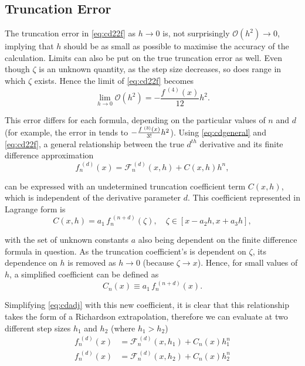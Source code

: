\subsection{Truncation Error}\label{sec:truncerr}

The truncation error in \cref{eq:cd22f} as $h\!\to\!0$ is, not surprisingly $\mathcal{O}(h^2)\!\to\!0$, implying that $h$ should be as small as possible to maximise the accuracy of the calculation.
Limits can also be put on the true truncation error as well.
Even though $\zeta$ is an unknown quantity, as the step size decreases, so does range in which $\zeta$ exists.
Hence the limit of \cref{eq:cd22f} becomes
\begin{equation}
\lim_{h \to 0}\mathcal{O}(h^2) =  - \frac{f^{\;(4)}(x)}{12}h^2.
\end{equation}

This error differs for each formula, depending on the particular values of $n$ and $d$ (for example, the error in  tends to $\cramped{-\frac{f^{\;(3)}(x)}{3!}h^2}$).
Using \cref{eq:cdgeneral} and \cref{eq:cd22f}, a general relationship between the true $d^{th}$ derivative and its finite difference approximation
\begin{equation}
 f_n^{\;(d)}(x) = \mathcal{F}_n^{\,(d)}(x,h) + C(x,h)h^n,\label{eq:cdadj}
\end{equation}

can be expressed with an undetermined truncation coefficient term $C(x,h)$, which is independent of the derivative parameter $d$.
This coefficient represented in Lagrange form is
\begin{equation}
C(x,h) = a_1\,f_n^{\;(n+d)}(\zeta), \quad \zeta \in [x-a_2h,x+a_3h],\label{eq:cdcxh}
\end{equation}

with the set of unknown constants $a$ also being dependent on the finite difference formula in question.
As the truncation coefficient's is dependent on $\zeta$, its dependence on $h$ is removed as $h\!\to\!0$ (because $\zeta\!\to\!x$).
Hence, for small values of $h$, a simplified coefficient can be defined as
\begin{equation}
 C_n(x) \equiv a_1\,f_n^{\;(n+d)}(x).
\end{equation}

Simplifying \cref{eq:cdadj} with this new coefficient, it is clear that this relationship takes the form of a Richardson extrapolation, therefore we can evaluate at two different step sizes $h_1$ and $h_2$ (where $h_1 > h_2$)
\begin{align}
f_n^{\;(d)}(x) &= \mathcal{F}_n^{\,(d)}(x,h_1) + C_n(x)h_1^n \\
f_n^{\;(d)}(x) &= \mathcal{F}_n^{\,(d)}(x,h_2) + C_n(x)h_2^n
\end{align}


